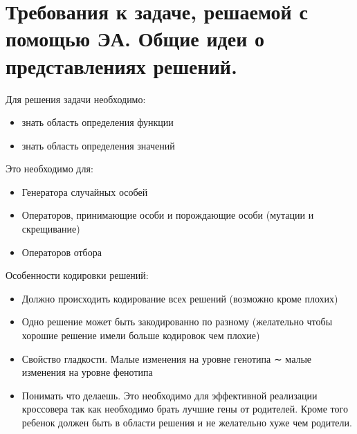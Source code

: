 \section{Требования к задаче, решаемой с помощью ЭА. Общие идеи о представлениях решений.}
Для решения задачи необходимо:
\begin{itemize}
	\item знать область определения функции
	\item знать область определения значений
\end{itemize}
Это необходимо для:
\begin{itemize}
	\item Генератора случайных особей
	\item Операторов, принимающие особи и порождающие особи (мутации и скрещивание)
	\item Операторов отбора
\end{itemize}
Особенности кодировки решений:
\begin{itemize}
	\item Должно происходить кодирование всех решений (возможно кроме плохих)
	\item Одно решение может быть закодированно по разному (желательно чтобы хорошие решение имели больше кодировок чем плохие)
	\item Свойство гладкости. Малые изменения на уровне генотипа ∼ малые изменения на уровне фенотипа
	\item Понимать что делаешь. Это необходимо для эффективной реализации кроссовера так как необходимо брать лучшие гены от родителей. Кроме того ребенок должен быть в области решения и не желательно хуже чем родители. 
\end{itemize}